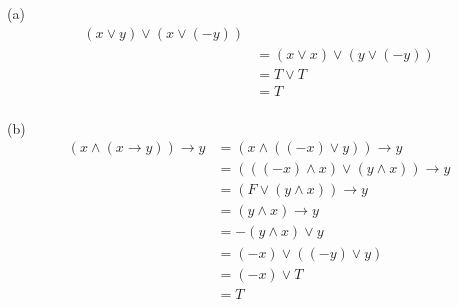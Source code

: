 \documentclass[12pt]{article}
\begin{document}
\vspace{.3in}
(a)
\[
\begin{aligned}
(x \vee y) \vee (x \vee (-y))\\
&=(x \vee x) \vee (y \vee (-y))\\
&=T \vee T\\
&=T \\
\end{aligned}
\]

\vspace{.15in}
(b) 
\[
\begin{aligned}
(x \wedge (x \rightarrow y)) \to y &= (x \wedge ((-x) \vee y)) \to y\\
&=(((-x) \wedge x) \vee (y \wedge x)) \to y\\
&=(F \vee (y \wedge x)) \to y\\
&=(y \wedge x) \to y\\
&=-(y \wedge x) \vee y\\
&=(-x) \vee ((-y) \vee y)\\
&=(-x) \vee T\\
&=T \\
\end{aligned}
\]
\end{document}
